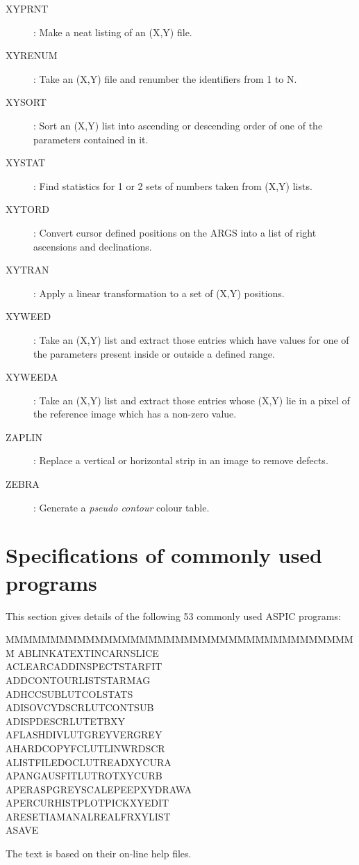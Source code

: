 \begin{description}
\item [XYPRNT]: Make a neat listing of an (X,Y) file.
\item [XYRENUM]: Take an (X,Y) file and renumber the identifiers from 1 to N.
\item [XYSORT]: Sort an (X,Y) list into ascending or descending order of one of
the parameters contained in it.
\item [XYSTAT]: Find statistics for 1 or 2 sets of numbers taken from (X,Y)
lists.
\item [XYTORD]: Convert cursor defined positions on the ARGS into a list of
right ascensions and declinations.
\item [XYTRAN]: Apply a linear transformation to a set of (X,Y) positions.
\item [XYWEED]: Take an (X,Y) list and extract those entries which have values
for one of the parameters present inside or outside a defined range.
\item [XYWEEDA]: Take an (X,Y) list and extract those entries whose (X,Y) lie
in a pixel of the reference image which has a non-zero value.
\item [ZAPLIN]: Replace a vertical or horizontal strip in an image to remove
defects.
\item [ZEBRA]: Generate a {\em pseudo contour} colour table.
\end{description}

\newpage
\section {Specifications of commonly used programs}
This section gives details of the following 53 commonly used ASPIC programs:

\begin{tabbing}
MMMM\=MMMMMMMMMMMM\=MMMMMMMMMMMM\=MMMMMMMMMMMM\=\kill
\>ABLINK\>ATEXT\>INCARN\>SLICE\\
\>ACLEAR\>CADD\>INSPECT\>STARFIT\\
\>ADD\>CONTOUR\>LIST\>STARMAG\\
\>ADHC\>CSUB\>LUTCOL\>STATS\\
\>ADISOV\>CYDSCR\>LUTCONT\>SUB\\
\>ADISP\>DESCR\>LUTE\>TBXY\\
\>AFLASH\>DIV\>LUTGREY\>VERGREY\\
\>AHARDCOPY\>FC\>LUTLIN\>WRDSCR\\
\>ALIST\>FILEDOC\>LUTREAD\>XYCURA\\
\>APAN\>GAUSFIT\>LUTROT\>XYCURB\\
\>APERASP\>GREYSCALE\>PEEP\>XYDRAWA\\
\>APERCUR\>HISTPLOT\>PICK\>XYEDIT\\
\>ARESET\>IAMANAL\>REALFR\>XYLIST\\
\>ASAVE
\end{tabbing}
The text is based on their on-line help files.\\

